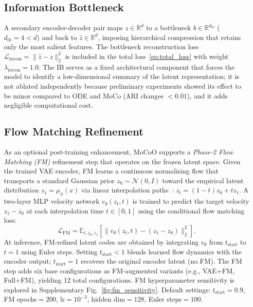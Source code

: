 \documentclass[preprint,12pt,number]{elsarticle}
\begin{document}
\subsection{Information Bottleneck}
\label{sec:method:ib}

A secondary encoder-decoder pair maps $z \in \mathbb{R}^{d}$ to a bottleneck $b \in \mathbb{R}^{d_{\mathrm{ib}}}$ ($d_{\mathrm{ib}} = 4 < d$) and back to $\hat{z} \in \mathbb{R}^{d}$, imposing hierarchical compression that retains only the most salient features. The bottleneck reconstruction loss $\mathcal{L}_{\mathrm{irecon}} = \|\hat{z} - z\|_2^2$ is included in the total loss~\eqref{eq:total_loss} with weight $\lambda_{\mathrm{irecon}} = 1.0$. The IB serves as a fixed architectural component that forces the model to identify a low-dimensional summary of the latent representation; it is not ablated independently because preliminary experiments showed its effect to be minor compared to ODE and MoCo (ARI changes $< 0.01$), and it adds negligible computational cost.

\subsection{Flow Matching Refinement}
\label{sec:method:fm}

As an optional post-training enhancement, MoCoO supports a \emph{Phase-2 Flow Matching (FM)} refinement step that operates on the frozen latent space. Given the trained VAE encoder, FM learns a continuous normalising flow that transports a standard Gaussian prior $z_0 \sim \mathcal{N}(0, I)$ toward the empirical latent distribution $z_1 = \mu_\phi(x)$ via linear interpolation paths~\cite{lipman2023flow}: $z_t = (1 - t) z_0 + t z_1$. A two-layer MLP velocity network $v_\theta(z_t, t)$ is trained to predict the target velocity $z_1 - z_0$ at each interpolation time $t \in [0, 1]$ using the conditional flow matching loss:
\begin{equation}
    \mathcal{L}_{\mathrm{FM}} = \mathbb{E}_{t, z_0, z_1}\!\left[\| v_\theta(z_t, t) - (z_1 - z_0) \|_2^2\right].
    \label{eq:fm_loss}
\end{equation}
At inference, FM-refined latent codes are obtained by integrating $v_\theta$ from $t_{\mathrm{start}}$ to $t{=}1$ using Euler steps. Setting $t_{\mathrm{start}} < 1$ blends learned flow dynamics with the encoder output; $t_{\mathrm{start}} = 1$ recovers the original encoder latent (no FM). The FM step adds six base configurations as FM-augmented variants (e.g., VAE+FM, Full+FM), yielding 12 total configurations. FM hyperparameter sensitivity is explored in Supplementary Fig.~\ref{fig:fm_sensitivity}. Default settings: $t_{\mathrm{start}}{=}0.9$, FM epochs${=}200$, lr${=}10^{-3}$, hidden dim${=}128$, Euler steps${=}100$.
\end{document}
